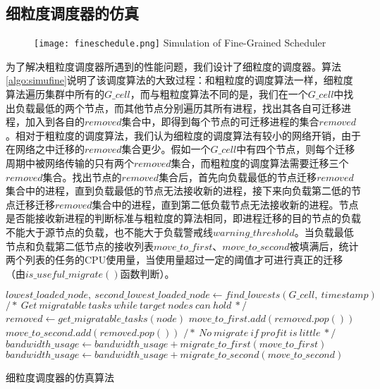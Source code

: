 \subsection{细粒度调度器的仿真}
\begin{figure}[!htp]
  \centering
  \texttt{[image: fineschedule.png]}
    {Simulation of Fine-Grained Scheduler}
  \label{fig:simufine}
\end{figure}
为了解决粗粒度调度器所遇到的性能问题，我们设计了细粒度的调度器。算法\ref{algo:simufine}说明了该调度算法的大致过程：和粗粒度的调度算法一样，细粒度算法遍历集群中所有的$G\_cell$，而与粗粒度算法不同的是，我们在一个$G\_cell$中找出负载最低的两个节点，而其他节点分别遍历其所有进程，找出其各自可迁移进程，加入到各自的$removed$集合中，即得到每个节点的可迁移进程的集合$removed$。相对于粗粒度的调度算法，我们认为细粒度的调度算法有较小的网络开销，由于在网络之中迁移的$removed$集合更少。假如一个$G\_cell$中有四个节点，则每个迁移周期中被网络传输的只有两个$removed$集合，而粗粒度的调度算法需要迁移三个$removed$集合。找出节点的$removed$集合后，首先向负载最低的节点迁移$removed$集合中的进程，直到负载最低的节点无法接收新的进程，接下来向负载第二低的节点迁移迁移$removed$集合中的进程，直到第二低负载节点无法接收新的进程。节点是否能接收新进程的判断标准与粗粒度的算法相同，即进程迁移的目的节点的负载不能大于源节点的负载，也不能大于负载警戒线$warning\_threshold$。当负载最低节点和负载第二低节点的接收列表$move\_to\_first$、$move\_to\_second$被填满后，统计两个列表的任务的CPU使用量，当使用量超过一定的阈值才可进行真正的迁移（由$is\_useful\_migrate()$函数判断）。
\begin{algorithm}[h]
\begin{algorithmic}[1]
\State $lowest\_loaded\_node,\ second\_lowest\_loaded\_node \gets find\_lowests(G\_cell,\  timestamp)$
\State
{}
\State $/*\ Get\ migratable\ tasks\ while\ target\ nodes\ can\ hold\ */$
\State $removed \gets get\_migratable\_tasks(node)$
\State $move\_to\_first.add(removed.pop())$
\EndWhile
{}
\State $move\_to\_second.add(removed.pop())$
\EndWhile
\State
\State $/*\ No\ migrate\ if\ profit\ is\ little\ */$
\State $bandwidth\_usage \gets bandwidth\_usage + migrate\_to\_first(move\_to\_first)$
\EndIf
{}
\State $bandwidth\_usage \gets bandwidth\_usage + migrate\_to\_second(move\_to\_second)$
\EndIf
\EndFor
\EndFor
\end{algorithmic}
\caption{细粒度调度器的仿真算法}
\label{algo:simufine}
\end{algorithm}

